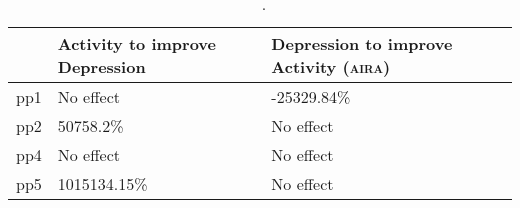 \begin{table}[ht]
\centering
\begin{tabular}{rll}
  \toprule
 & Activity to improve Depression & Depression to improve Activity (\textsc{aira}) \\ 
  \midrule
pp1 & No effect & -25329.84\% \\ 
  pp2 & 50758.2\% & No effect \\ 
  pp4 & No effect & No effect \\ 
  pp5 & 1015134.15\% & No effect \\ 
   \bottomrule
\end{tabular}
\caption{\citeauthor{RefWorks:4}~\cite{RefWorks:4}.} 
\label{tab:effects}
\end{table}

